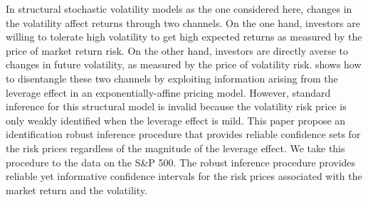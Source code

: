 In structural stochastic volatility models as the one considered here, changes in the volatility affect returns through two channels. On the one hand, investors are willing to tolerate high volatility to get high expected returns as measured by the price of market return risk. On the other hand, investors are directly averse to changes in future volatility, as measured by the price of volatility risk. \Textcite{han2018leverage} shows how to disentangle these two channels by exploiting information arising from the leverage effect in an exponentially-affine pricing model. However, standard inference for this structural model is invalid because the volatility risk price is only weakly identified when the leverage effect is mild. This paper propose an identification robust inference procedure that provides reliable confidence sets for the risk prices regardless of the magnitude of the leverage effect. We take this procedure to the data on the S\&P 500. The robust inference procedure provides reliable yet informative confidence intervals for the risk prices associated with the market return and the volatility. 





